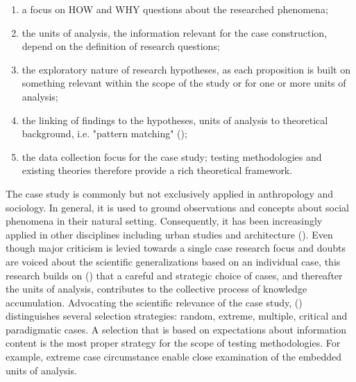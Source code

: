 \documentclass[11pt]{report}
\begin{document}
{{{{\begin{enumerate}
\item a focus on HOW and WHY questions about the researched phenomena;
\item the units of analysis, the information relevant for the case construction, depend on the definition of research questions;
\item the exploratory nature of research hypotheses, as each proposition is built on something relevant within the scope of the study or for one or more units of analysis;
\item the linking of findings to the hypotheses, units of analysis to theoretical background, i.e. "pattern matching" (\href{Campbell}{\citealt{campbell_iii.degrees_1975}});
\item the data collection focus for the case study; testing methodologies and existing theories therefore provide a rich theoretical framework.
\end{enumerate}

The case study is commonly but not exclusively applied in anthropology and sociology.
In general, it is used to ground observations and concepts about social phenomena in their natural setting. Consequently, it has been increasingly applied in other disciplines including urban studies and architecture (\href{Feagin}{\citealt{feagin_case_1991}}). Even though major criticism is levied towards a single case research focus and doubts are voiced about the scientific generalizations based on an individual case, this research builds on (\href{Flyvbjerg}{\citealt{flyvbjerg_five_2006}}) that a careful and strategic choice of cases, and thereafter the units of analysis, contributes to the collective process of knowledge accumulation.
Advocating the scientific relevance of the case study, (\href{Flvybjerg}{\citealt{flyvbjerg_five_2006}}) distinguishes several selection strategies: random, extreme, multiple, critical and paradigmatic cases. A selection that is based on expectations about information content is the most proper strategy for the scope of testing methodologies. For example, extreme case circumstance enable close examination of the embedded units of analysis.
\\

}}}}
\end{document}
